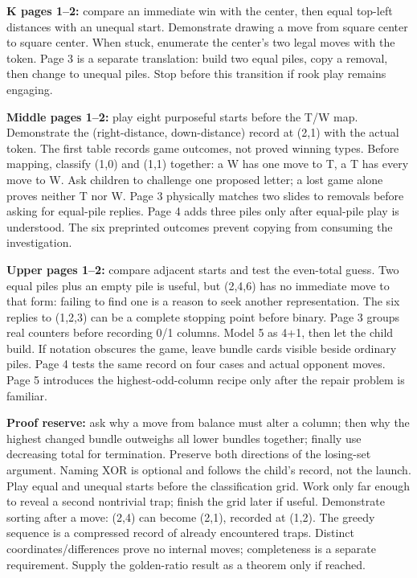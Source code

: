 \documentclass[11pt]{article}
\begin{document}
\newpage
{}
\textbf{K pages 1--2:} compare an immediate win with the center, then equal top-left distances with an unequal start. Demonstrate drawing a move from square center to square center. When stuck, enumerate the center's two legal moves with the token. Page 3 is a separate translation: build two equal piles, copy a removal, then change to unequal piles. Stop before this transition if rook play remains engaging.

\textbf{Middle pages 1--2:} play eight purposeful starts before the T/W map. Demonstrate the (right-distance, down-distance) record at (2,1) with the actual token. The first table records game outcomes, not proved winning types. Before mapping, classify (1,0) and (1,1) together: a W has one move to T, a T has every move to W. Ask children to challenge one proposed letter; a lost game alone proves neither T nor W. Page 3 physically matches two slides to removals before asking for equal-pile replies. Page 4 adds three piles only after equal-pile play is understood. The six preprinted outcomes prevent copying from consuming the investigation.

\textbf{Upper pages 1--2:} compare adjacent starts and test the even-total guess. Two equal piles plus an empty pile is useful, but (2,4,6) has no immediate move to that form: failing to find one is a reason to seek another representation. The six replies to (1,2,3) can be a complete stopping point before binary. Page 3 groups real counters before recording 0/1 columns. Model 5 as 4+1, then let the child build. If notation obscures the game, leave bundle cards visible beside ordinary piles. Page 4 tests the same record on four cases and actual opponent moves. Page 5 introduces the highest-odd-column recipe only after the repair problem is familiar.

\textbf{Proof reserve:} ask why a move from balance must alter a column; then why the highest changed bundle outweighs all lower bundles together; finally use decreasing total for termination. Preserve both directions of the losing-set argument. Naming XOR is optional and follows the child's record, not the launch.
Play equal and unequal starts before the classification grid. Work only far enough to reveal a second nontrivial trap; finish the grid later if useful. Demonstrate sorting after a move: (2,4) can become (2,1), recorded at (1,2). The greedy sequence is a compressed record of already encountered traps. Distinct coordinates/differences prove no internal moves; completeness is a separate requirement. Supply the golden-ratio result as a theorem only if reached.
\end{document}
